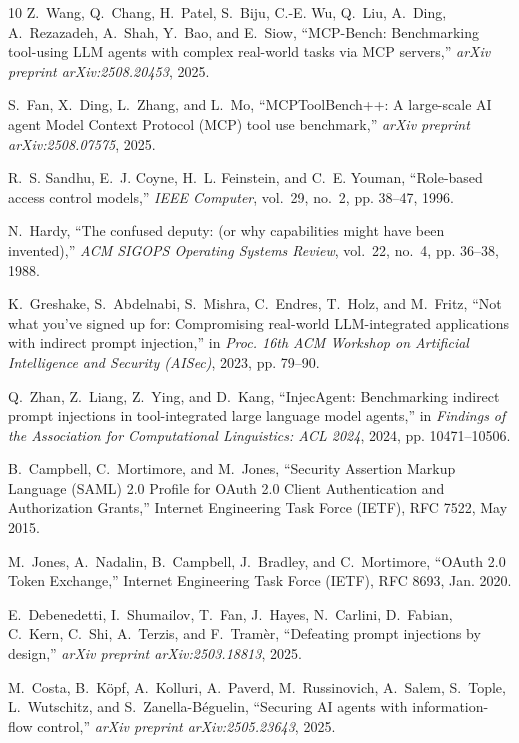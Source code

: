 \documentclass[conference,10pt]{IEEEtran}
\begin{document}
\begin{thebibliography}{10}
Z.~Wang, Q.~Chang, H.~Patel, S.~Biju, C.-E. Wu, Q.~Liu, A.~Ding, A.~Rezazadeh, A.~Shah, Y.~Bao, and E.~Siow, ``{MCP-Bench}: Benchmarking tool-using {LLM} agents with complex real-world tasks via {MCP} servers,'' \emph{arXiv preprint arXiv:2508.20453}, 2025.

S.~Fan, X.~Ding, L.~Zhang, and L.~Mo, ``{MCPToolBench++}: A large-scale {AI} agent Model Context Protocol ({MCP}) tool use benchmark,'' \emph{arXiv preprint arXiv:2508.07575}, 2025.

R.~S. Sandhu, E.~J. Coyne, H.~L. Feinstein, and C.~E. Youman, ``Role-based access control models,'' \emph{IEEE Computer}, vol.~29, no.~2, pp. 38--47, 1996.

N.~Hardy, ``The confused deputy: (or why capabilities might have been invented),'' \emph{ACM SIGOPS Operating Systems Review}, vol.~22, no.~4, pp. 36--38, 1988.

K.~Greshake, S.~Abdelnabi, S.~Mishra, C.~Endres, T.~Holz, and M.~Fritz, ``Not what you've signed up for: Compromising real-world {LLM}-integrated applications with indirect prompt injection,'' in \emph{Proc. 16th ACM Workshop on Artificial Intelligence and Security (AISec)}, 2023, pp. 79--90.

Q.~Zhan, Z.~Liang, Z.~Ying, and D.~Kang, ``{InjecAgent}: Benchmarking indirect prompt injections in tool-integrated large language model agents,'' in \emph{Findings of the Association for Computational Linguistics: ACL 2024}, 2024, pp. 10471--10506.

B.~Campbell, C.~Mortimore, and M.~Jones, ``Security Assertion Markup Language ({SAML}) 2.0 Profile for {OAuth} 2.0 Client Authentication and Authorization Grants,'' Internet Engineering Task Force (IETF), RFC 7522, May 2015.

M.~Jones, A.~Nadalin, B.~Campbell, J.~Bradley, and C.~Mortimore, ``{OAuth} 2.0 Token Exchange,'' Internet Engineering Task Force (IETF), RFC 8693, Jan. 2020.

E.~Debenedetti, I.~Shumailov, T.~Fan, J.~Hayes, N.~Carlini, D.~Fabian, C.~Kern, C.~Shi, A.~Terzis, and F.~Tram{\`e}r, ``Defeating prompt injections by design,'' \emph{arXiv preprint arXiv:2503.18813}, 2025.

M.~Costa, B.~K{\"o}pf, A.~Kolluri, A.~Paverd, M.~Russinovich, A.~Salem, S.~Tople, L.~Wutschitz, and S.~Zanella-B{\'e}guelin, ``Securing {AI} agents with information-flow control,'' \emph{arXiv preprint arXiv:2505.23643}, 2025.


\end{thebibliography}
\end{document}
